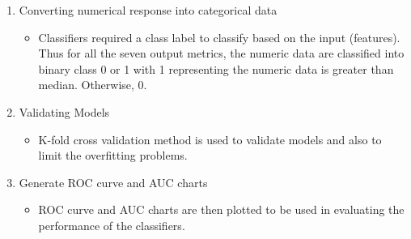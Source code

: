 \begin{enumerate}
    \item Converting numerical response into categorical data
        \begin{itemize}
            \item Classifiers required a class label to classify based on the input (features). Thus for all the seven output metrics, the numeric data are classified into binary class 0 or 1 with 1 representing the numeric data is greater than median. Otherwise, 0. 
        \end{itemize}
    \item Validating Models
        \begin{itemize}
            \item K-fold cross validation method is used to validate models and also to limit the overfitting problems.
        \end{itemize}
    \item Generate ROC curve and AUC charts
        \begin{itemize}
            \item ROC curve and AUC charts are then plotted to be used in evaluating the performance of the classifiers.
        \end{itemize}
\end{enumerate}